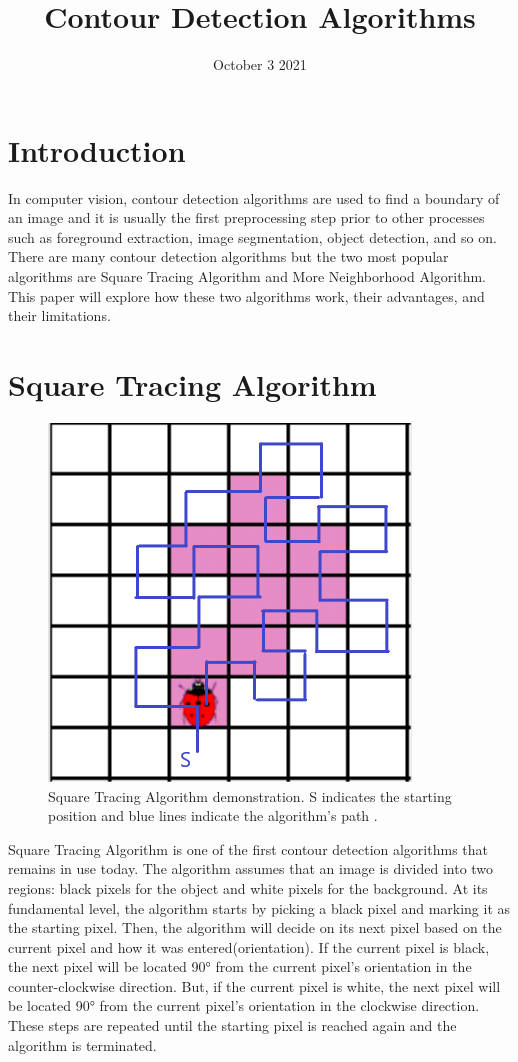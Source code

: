 \documentclass[conference]{IEEEtran}
\title{Contour Detection Algorithms}
\author{
    \IEEEauthorblockN{Sotheanith Sok}
    \IEEEauthorblockA{
        Department of Engineering\\ 
        California State University of Long Beach\\
        Sotheanith.Sok@student.csulb.edu
    }
}
\date{October 3 2021}
\begin{document}
\maketitle

\section{Introduction}
In computer vision, contour detection algorithms are used to find a boundary of an image and it is usually the first preprocessing step prior to other processes such as foreground extraction, image segmentation, object detection, and so on. There are many contour detection algorithms but the two most popular algorithms are Square Tracing Algorithm and More Neighborhood Algorithm. This paper will explore how these two algorithms work, their advantages, and their limitations.

\section{Square Tracing Algorithm}

\begin{figure}[!htb]
    \centering
    \includegraphics[scale = 0.5]{fig1.png}
    \caption{Square Tracing Algorithm demonstration. S indicates the starting position and blue lines indicate the algorithm's path \cite{sta:2000}.}
\end{figure}

Square Tracing Algorithm is one of the first contour detection algorithms that remains in use today. The algorithm assumes that an image is divided into two regions: black pixels for the object and white pixels for the background. At its fundamental level, the algorithm starts by picking a black pixel and marking it as the starting pixel. Then, the algorithm will decide on its next pixel based on the current pixel and how it was entered(orientation). If the current pixel is black, the next pixel will be located 90° from the current pixel's orientation in the counter-clockwise direction. But, if the current pixel is white, the next pixel will be located 90° from the current pixel's orientation in the clockwise direction. These steps are repeated until the starting pixel is reached again and the algorithm is terminated.
\end{document}
